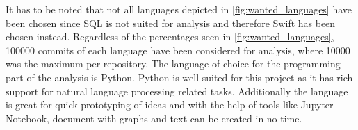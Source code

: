 \documentclass{article}
\begin{document}
  It has to be noted that not all languages depicted in
  \autoref{fig:wanted_languages} have been chosen since SQL is not suited for
  analysis and therefore Swift has been chosen instead. Regardless of the
  percentages seen in \autoref{fig:wanted_languages}, 100000 commits of each
  language have been considered for analysis, where 10000 was the maximum per
  repository. The language of choice for the programming part of the analysis
  is Python. Python is well suited for this project as it has rich support for
  natural language processing related tasks. Additionally the language is great
  for quick prototyping of ideas and with the help of tools like Jupyter
  Notebook, document with graphs and text can be created in no time.
\end{document}
